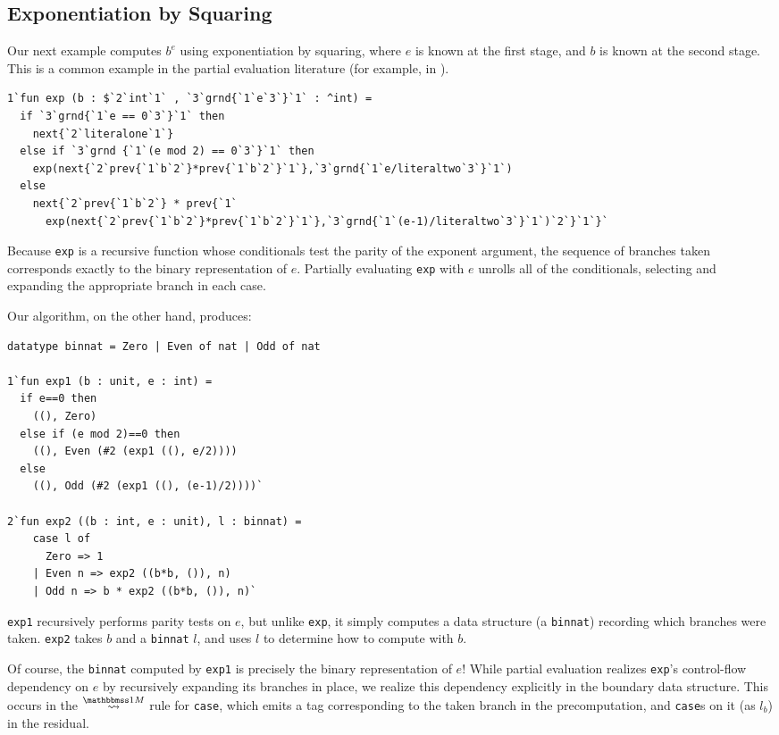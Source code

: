 \subsection{Exponentiation by Squaring}

Our next example computes $b^e$ using exponentiation by squaring, where $e$ is
known at the first stage, and $b$ is known at the second stage. This is a common
example in the partial evaluation literature (for example, in \cite{jones96}).
%
\begin{lstlisting} 
1`fun exp (b : $`2`int`1` , `3`grnd{`1`e`3`}`1` : ^int) = 
  if `3`grnd{`1`e == 0`3`}`1` then 
    next{`2`literalone`1`}
  else if `3`grnd {`1`(e mod 2) == 0`3`}`1` then
    exp(next{`2`prev{`1`b`2`}*prev{`1`b`2`}`1`},`3`grnd{`1`e/literaltwo`3`}`1`)
  else 
    next{`2`prev{`1`b`2`} * prev{`1`
      exp(next{`2`prev{`1`b`2`}*prev{`1`b`2`}`1`},`3`grnd{`1`(e-1)/literaltwo`3`}`1`)`2`}`1`}`
\end{lstlisting}
%
Because \texttt{exp} is a recursive function whose conditionals test the parity
of the exponent argument, the sequence of branches taken corresponds exactly to
the binary representation of $e$. Partially evaluating \texttt{exp} with $e$
unrolls all of the conditionals, selecting and expanding the appropriate branch
in each case.

Our algorithm, on the other hand, produces:
%
\begin{lstlisting} 
datatype binnat = Zero | Even of nat | Odd of nat

1`fun exp1 (b : unit, e : int) =
  if e==0 then
    ((), Zero)
  else if (e mod 2)==0 then 
    ((), Even (#2 (exp1 ((), e/2))))
  else 
    ((), Odd (#2 (exp1 ((), (e-1)/2))))`

2`fun exp2 ((b : int, e : unit), l : binnat) =
    case l of
      Zero => 1
    | Even n => exp2 ((b*b, ()), n)
    | Odd n => b * exp2 ((b*b, ()), n)`
\end{lstlisting}
%
\texttt{exp1} recursively performs parity tests on $e$, but unlike \texttt{exp},
it simply computes a data structure (a \texttt{binnat}) recording which branches
were taken. \texttt{exp2} takes $b$ and a \texttt{binnat} $l$, and uses $l$ to
determine how to compute with $b$.

Of course, the \texttt{binnat} computed by \texttt{exp1} is precisely the binary
representation of $e$! While partial evaluation realizes \texttt{exp}'s
control-flow dependency on $e$ by recursively expanding its branches in place,
we realize this dependency explicitly in the boundary data structure. This
occurs in the $\splitonesym$ rule for \texttt{case}, which emits a tag
corresponding to the taken branch in the precomputation, and \texttt{case}s on
it (as $l_b$) in the residual.

